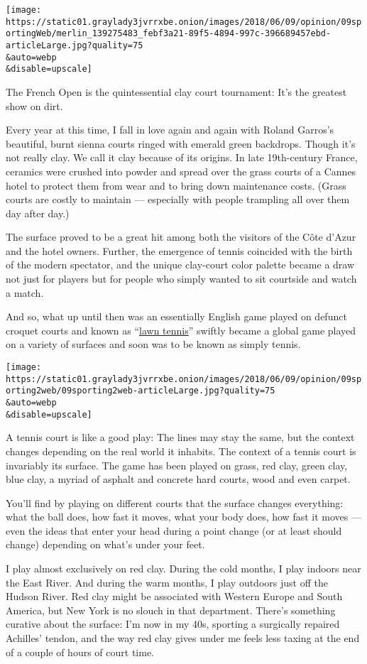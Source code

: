 \texttt{[image: https://static01.graylady3jvrrxbe.onion/images/2018/06/09/opinion/09sportingWeb/merlin\_139275483\_febf3a21-89f5-4894-997c-396689457ebd-articleLarge.jpg?quality=75\\\&auto=webp\\\&disable=upscale]}

The French Open is the quintessential clay court tournament: It's the
greatest show on dirt.

Every year at this time, I fall in love again and again with Roland
Garros's beautiful, burnt sienna courts ringed with emerald green
backdrops. Though it's not really clay. We call it clay because of its
origins. In late 19th-century France, ceramics were crushed into powder
and spread over the grass courts of a Cannes hotel to protect them from
wear and to bring down maintenance costs. (Grass courts are costly to
maintain --- especially with people trampling all over them day after
day.)

The surface proved to be a great hit among both the visitors of the Côte
d'Azur and the hotel owners. Further, the emergence of tennis coincided
with the birth of the modern spectator, and the unique clay-court color
palette became a draw not just for players but for people who simply
wanted to sit courtside and watch a match.

And so, what up until then was an essentially English game played on
defunct croquet courts and known as
``\href{http://www.fundinguniverse.com/company-histories/the-all-england-lawn-tennis-croquet-club-history/}{lawn
tennis}'' swiftly became a global game played on a variety of surfaces
and soon was to be known as simply tennis.

\texttt{[image: https://static01.graylady3jvrrxbe.onion/images/2018/06/09/opinion/09sporting2web/09sporting2web-articleLarge.jpg?quality=75\\\&auto=webp\\\&disable=upscale]}

A tennis court is like a good play: The lines may stay the same, but the
context changes depending on the real world it inhabits. The context of
a tennis court is invariably its surface. The game has been played on
grass, red clay, green clay, blue clay, a myriad of asphalt and concrete
hard courts, wood and even carpet.

You'll find by playing on different courts that the surface changes
everything: what the ball does, how fast it moves, what your body does,
how fast it moves --- even the ideas that enter your head during a point
change (or at least should change) depending on what's under your feet.

I play almost exclusively on red clay. During the cold months, I play
indoors near the East River. And during the warm months, I play outdoors
just off the Hudson River. Red clay might be associated with Western
Europe and South America, but New York is no slouch in that department.
There's something curative about the surface: I'm now in my 40s,
sporting a surgically repaired Achilles' tendon, and the way red clay
gives under me feels less taxing at the end of a couple of hours of
court time.

